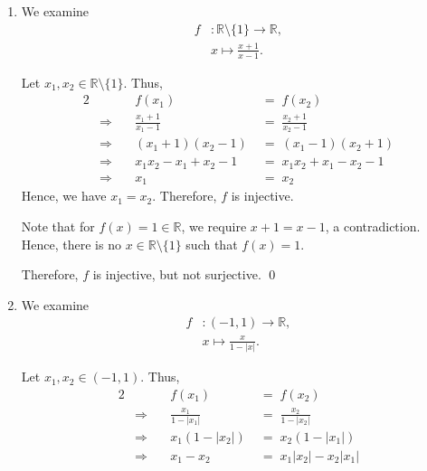 \documentclass[10pt]{article}
\begin{document}
\begin{enumerate}
                Therefore, $f$ is neither injective, nor surjective. \qed

                \item We examine
                \begin{align*}
                        f&: \mathbb{R}\setminus\{1\} \to \mathbb{R},\\
                        &x \mapsto \frac{x+1}{x-1} .
                \end{align*}

                Let $x_1, x_2 \in \mathbb{R}\setminus\{1\}$. Thus,
                \begin{alignat*}{2}
                        &&f(x_1) \;&=\; f(x_2) \\
                        &\Rightarrow\quad& \frac{x_1 + 1}{x_1 - 1}  \;&=\; \frac{x_2 + 1}{x_2 - 1} \\
                        &\Rightarrow\quad& (x_1 + 1)(x_2 - 1)  \;&=\; (x_1 - 1)(x_2 + 1) \tag{$x \neq 1$} \\
                        &\Rightarrow\quad& x_1x_2 - x_1 + x_2  - 1 \;&=\; x_1x_2 + x_1 - x_2 - 1\\ 
                        &\Rightarrow\quad& x_1 \;&=\; x_2
                \end{alignat*}
                Hence, we have $x_1 = x_2$. Therefore, $f$ is injective.

                Note that for $f(x) = 1 \in \mathbb{R}$, we require $x + 1 = x - 1$, a contradiction. Hence, there is no
                $x \in \mathbb{R}\setminus\{1\}$ such that $f(x) = 1$.

                Therefore, $f$ is injective, but not surjective. \qed

                \item We examine
                \begin{align*}
                        f&: (-1, 1) \to \mathbb{R},\\
                        &x \mapsto  \frac{x}{1 - |x|}.
                \end{align*}
                
                Let $x_1, x_2 \in (-1, 1)$. Thus,
                \begin{alignat*}{2}
                        &&f(x_1) \;&=\; f(x_2) \\
                        &\Rightarrow\quad& \frac{x_1}{1 - |x_1|} \;&=\; \frac{x_2}{1 - |x_2|} \\
                        &\Rightarrow\quad& x_1(1 - |x_2|) \;&=\; x_2(1 - |x_1|) \tag{$|x| \neq 1$}\\
                        &\Rightarrow\quad& x_1 - x_2 \;&=\; x_1|x_2| - x_2|x_1|
                \end{alignat*}
                

\end{enumerate}
\end{document}
